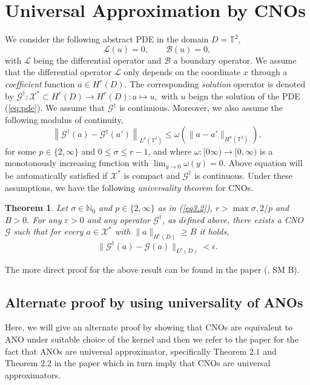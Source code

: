 \documentclass[reqno,10pt]{amsart}
\theoremstyle{plain}
\newtheorem{thm}{Theorem}
\theoremstyle{definition}
\newcommand{\bb}[1]{\mathbb{#1}}
\newcommand{\cal}[1]{\mathcal{#1}}
\begin{document}
    \section{Universal Approximation by CNOs}
    \noindent We consider the following abstract PDE in the domain $D = \bb T^2$,
    \begin{equation}\label{eq:pde}
        \cal L(u) = 0, \qquad \cal B(u) = 0,
    \end{equation}
    with $\cal L$ being the differential operator and $\cal B$ a boundary operator. We assume that the differential operator $\cal L$ only depends on the coordinate $x$ through a {\it coefficient} function $a \in H^r(D).$ The corresponding {\it solution} operator is denoted by $\cal G^\dag : \cal X^* \subset H^r(D) \to H^r(D) : a \mapsto u,$ with $u$ beign the solution of the PDE (\ref{eq:pde}). We assume that $\cal G^\dag$ is continuous. Moreover, we also assume the following modulus of continuity,
    \begin{equation}\label{eq3.2}
        \left\|\cal G^\dag(a) - \cal G^\dag(a')\right\|_{L^p(\bb T^2)} \leq \omega\left(\|a - a'\|_{H^\sigma(\bb T^2)}\right),
    \end{equation}
    for some $p \in \{2,\infty\}$ and $0 \leq \sigma \leq r-1$, and where $\omega : [0\infty) \to [0,\infty)$ is a monotonously increasing function with $\lim_{y \to 0} \omega (y) = 0$. Above equation will be automatically satisfied if $\cal X^*$ is compact and $\cal G^\dag$ is continuous. Under these assumptions, we have the following {\it universality theorem} for CNOs.

    \begin{thm}
        Let $\sigma \in \bb N_0$ and $p \in \{2,\infty\}$ as in (\ref{eq3.2}), $r > \max{\sigma, 2/p}$ and $B > 0$. For any $\varepsilon > 0$ and any operator $\cal G^\dag$, as defined above, there exists a CNO $\cal G$ such that for every $a \in \cal X^*$ with $\|a\|_{H^r(D)} \geq B$ it holds,
        \begin{equation}
            \|\cal G^\dag(a) - \cal G(a)\|_{L^p(D)} < \epsilon.
        \end{equation}
    \end{thm}
    \noindent The more direct proof for the above result can be found in the paper (\cite{BR2023}, SM B).
    
    \subsection{Alternate proof by using universality of ANOs}
    Here, we will give an alternate proof by showing that CNOs are equivalent to ANO under suitable choice of the kernel and then we refer to the paper \cite{SL2024} for the fact that ANOs are universal approximator, specifically Theorem $2.1$ and Theorem $2.2$ in the paper \cite{SL2024} which in turn imply that CNOs are universal approximators.
\end{document}

